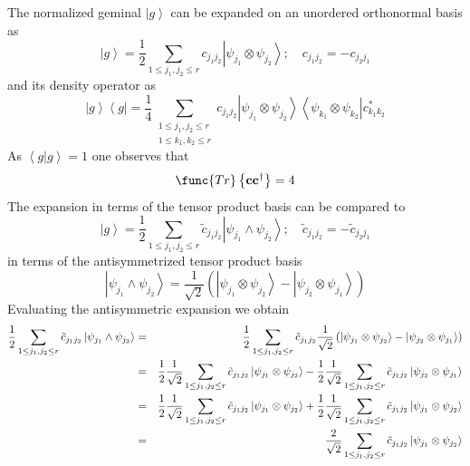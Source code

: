 \documentclass[aps,preprint]{revtex4}
\begin{document}
The normalized geminal $\left\vert g\right\rangle $ can be expanded on an
unordered orthonormal basis as 
\begin{equation}
\left\vert g\right\rangle =\frac{1}{2}\sum_{1\leq j_{1},j_{2}\leq
r}c_{j_{1}j_{2}}\left\vert \psi _{j_{1}}\otimes \psi _{j_{2}}\right\rangle
;\quad c_{j_{1}j_{2}}=-c_{j_{2}j_{1}}
\end{equation}%
and its density operator as 
\begin{equation}
\left\vert g\right\rangle \left\langle g\right\vert =\frac{1}{4}\sum
_{\substack{ 1\leq j_{1},j_{2}\leq r \\ 1\leq k_{1},k_{2}\leq r}}%
c_{j_{1}j_{2}}\left\vert \psi _{j_{1}}\otimes \psi _{j_{2}}\right\rangle
\left\langle \psi _{k_{1}}\otimes \psi _{k_{2}}\right\vert
c_{k_{1}k_{2}}^{\ast }
\end{equation}%
As $\left\langle g|g\right\rangle =1$ one observes that 
\begin{equation}
\func{Tr}\left\{ \mathbf{cc}^{\dagger }\right\} =4
\end{equation}%
The expansion in terms of the tensor product basis can be compared to 
\begin{equation}
\left\vert g\right\rangle =\frac{1}{2}\sum_{1\leq j_{1},j_{2}\leq r}\tilde{c}%
_{j_{1}j_{2}}\left\vert \psi _{j_{1}}\wedge \psi _{j_{2}}\right\rangle
;\quad \tilde{c}_{j_{1}j_{2}}=-\tilde{c}_{j_{2}j_{1}}
\end{equation}%
in terms of the antisymmetrized tensor product basis 
\begin{equation}
\left\vert \psi _{j_{1}}\wedge \psi _{j_{2}}\right\rangle =\frac{1}{\sqrt{2}}%
\left( \left\vert \psi _{j_{1}}\otimes \psi _{j_{2}}\right\rangle
-\left\vert \psi _{j_{2}}\otimes \psi _{j_{1}}\right\rangle \right) 
\end{equation}%
Evaluating the antisymmetric expansion we obtain 
\begin{eqnarray}
\frac{1}{2}\sum_{1\leq j_{1},j_{2}\leq r}\tilde{c}_{j_{1}j_{2}}\left\vert
\psi _{j_{1}}\wedge \psi _{j_{2}}\right\rangle  &=&\frac{1}{2}\sum_{1\leq
j_{1},j_{2}\leq r}\tilde{c}_{j_{1}j_{2}}\frac{1}{\sqrt{2}}\left( \left\vert
\psi _{j_{1}}\otimes \psi _{j_{2}}\right\rangle -\left\vert \psi
_{j_{2}}\otimes \psi _{j_{1}}\right\rangle \right)   \notag \\
&=&\frac{1}{2}\frac{1}{\sqrt{2}}\sum_{1\leq j_{1},j_{2}\leq r}\tilde{c}%
_{j_{1}j_{2}}\left\vert \psi _{j_{1}}\otimes \psi _{j_{2}}\right\rangle -%
\frac{1}{2}\frac{1}{\sqrt{2}}\sum_{1\leq j_{1},j_{2}\leq r}\tilde{c}%
_{j_{1}j_{2}}\left\vert \psi _{j_{2}}\otimes \psi _{j_{1}}\right\rangle  
\notag \\
&=&\frac{1}{2}\frac{1}{\sqrt{2}}\sum_{1\leq j_{1},j_{2}\leq r}\tilde{c}%
_{j_{1}j_{2}}\left\vert \psi _{j_{1}}\otimes \psi _{j_{2}}\right\rangle +%
\frac{1}{2}\frac{1}{\sqrt{2}}\sum_{1\leq j_{1},j_{2}\leq r}\tilde{c}%
_{j_{1}j_{2}}\left\vert \psi _{j_{1}}\otimes \psi _{j_{2}}\right\rangle  
\notag \\
&=&\frac{2}{\sqrt{2}}\sum_{1\leq j_{1},j_{2}\leq r}\tilde{c}%
_{j_{1}j_{2}}\left\vert \psi _{j_{1}}\otimes \psi _{j_{2}}\right\rangle 
\end{eqnarray}%
\end{document}
